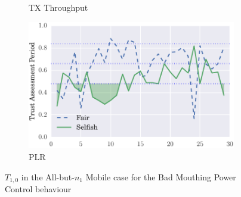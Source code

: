 \documentclass[runningheads,a4paper]{llncs}
\begin{document}
\begin{figure}
\begin{subfigure}{0.32\textwidth}
  \caption{TX Throughput}
  \label{fig:allbut1_mobile_badmouthing_txthroughput}
\end{subfigure}
\begin{subfigure}{0.32\textwidth}
\centering
  \includegraphics[width=.95\linewidth]{img/trust_bella_allbut1_mobile_emph_PLR_BadMouthingPowerControl.pdf}
  \caption{PLR}
  \label{fig:allbut1_mobile_badmouthing_plr}
\end{subfigure}
\caption{$T_{1,0}$ in the All-but-$n_1$ Mobile case for the Bad Mouthing Power Control behaviour}
\label{fig:allbut1_mobile_badmouthing}
\end{figure}
\end{document}
